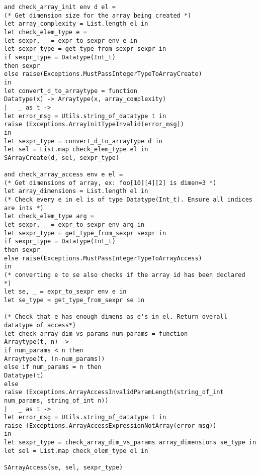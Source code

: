 \begin{verbatim}
and check_array_init env d el = 
(* Get dimension size for the array being created *)
let array_complexity = List.length el in
let check_elem_type e = 
let sexpr, _ = expr_to_sexpr env e in
let sexpr_type = get_type_from_sexpr sexpr in
if sexpr_type = Datatype(Int_t) 
then sexpr
else raise(Exceptions.MustPassIntegerTypeToArrayCreate)
in
let convert_d_to_arraytype = function
Datatype(x) -> Arraytype(x, array_complexity)
| 	_ as t -> 
let error_msg = Utils.string_of_datatype t in
raise (Exceptions.ArrayInitTypeInvalid(error_msg))
in
let sexpr_type = convert_d_to_arraytype d in
let sel = List.map check_elem_type el in
SArrayCreate(d, sel, sexpr_type)

and check_array_access env e el = 
(* Get dimensions of array, ex: foo[10][4][2] is dimen=3 *)
let array_dimensions = List.length el in
(* Check every e in el is of type Datatype(Int_t). Ensure all indices are ints *)
let check_elem_type arg = 
let sexpr, _ = expr_to_sexpr env arg in
let sexpr_type = get_type_from_sexpr sexpr in
if sexpr_type = Datatype(Int_t) 
then sexpr
else raise(Exceptions.MustPassIntegerTypeToArrayAccess)
in
(* converting e to se also checks if the array id has been declared  *)
let se, _ = expr_to_sexpr env e in 
let se_type = get_type_from_sexpr se in

(* Check that e has enough dimens as e's in el. Return overall datatype of access*)
let check_array_dim_vs_params num_params = function
Arraytype(t, n) -> 
if num_params < n then
Arraytype(t, (n-num_params))
else if num_params = n then
Datatype(t)
else
raise (Exceptions.ArrayAccessInvalidParamLength(string_of_int num_params, string_of_int n))
| 	_ as t -> 
let error_msg = Utils.string_of_datatype t in
raise (Exceptions.ArrayAccessExpressionNotArray(error_msg))
in
let sexpr_type = check_array_dim_vs_params array_dimensions se_type in
let sel = List.map check_elem_type el in

SArrayAccess(se, sel, sexpr_type)


\end{verbatim}
